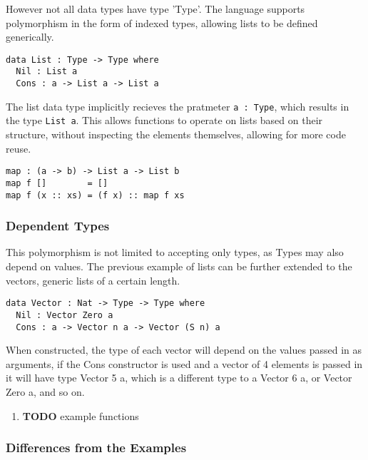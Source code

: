 \documentclass[a4paper]{article}
\begin{document}
However not all data types have type 'Type'. The language supports polymorphism in the form of indexed types, allowing 
lists to be defined generically. 

\begin{center}
\begin{verbatim}
data List : Type -> Type where
  Nil : List a
  Cons : a -> List a -> List a
\end{verbatim}
\end{center}

The list data type implicitly recieves the pratmeter \texttt{a : Type}, which results in the type \texttt{List a}. This allows functions
to operate on lists based on their structure, without inspecting the elements themselves, allowing for more code reuse. 

\begin{center}
\begin{verbatim}
map : (a -> b) -> List a -> List b
map f []        = []
map f (x :: xs) = (f x) :: map f xs
\end{verbatim}
\end{center}

\subsubsection{Dependent Types}
\label{sec:org400829b}
This polymorphism is not limited to accepting only types, as Types may
also depend on values. The previous example of lists can be further 
extended to the vectors, generic lists of a certain length. 

\begin{center}
\begin{verbatim}
data Vector : Nat -> Type -> Type where
  Nil : Vector Zero a
  Cons : a -> Vector n a -> Vector (S n) a
\end{verbatim}
\end{center}

When constructed, the type of each vector will depend on the values 
passed in as arguments, if the Cons constructor is used and a vector of 
4 elements is passed in it will have type Vector 5 a, which is a 
different type to a Vector 6 a, or Vector Zero a, and so on. 

\begin{enumerate}
\item {\bfseries\sffamily TODO} example functions
\label{sec:org03fa806}
\end{enumerate}

\subsubsection{Differences from the Examples}
\label{sec:org303024f}
\end{document}
